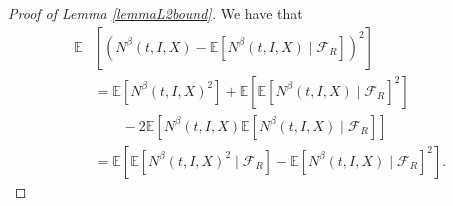 \documentclass{article}
\newcommand{\E}[0]{\mathbb{E}}
\newcommand{\bbone}{\text{\usefont{U}{bbold}{m}{n}1}}
\begin{document}
\begin{proof}[Proof of Lemma \ref{lemmaL2bound}]
We have that
\begin{equation}
    \begin{split}
         \E&\left[ \left(N^{\beta}(t, I,X)- \E\left[N^{\beta}(t, I,X)\mid \mathcal{F}_R \right] \right)^2 \right]\\&
         =\E\left[N^{\beta}(t, I,X)^2 \right] + \E\left[ \E\left[N^{\beta}(t, I,X) \mid\mathcal{F}_R \right] ^2 \right]\\& \qquad
         -2 \E\left[ N^{\beta}(t, I,X) \E\left[N^{\beta}(t, I,X) \mid\mathcal{F}_R \right] \right] \\&
         = \E\left[ \E\left[N^{\beta}(t, I,X)^2 \mid \mathcal{F}_R\right] -  \E\left[N^{\beta}(t, I,X) \mid\mathcal{F}_R \right] ^2 \right].
    \end{split}
\end{equation}




\end{proof}
\end{document}
